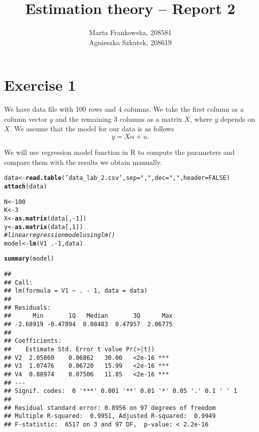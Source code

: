 \documentclass[12pt, a4paper]{article}\usepackage[]{graphicx}\usepackage[]{color}
\makeatletter
\newcommand{\hlnum}[1]{\textcolor[rgb]{0.686,0.059,0.569}{#1}}%
\newcommand{\hlstr}[1]{\textcolor[rgb]{0.192,0.494,0.8}{#1}}%
\newcommand{\hlcom}[1]{\textcolor[rgb]{0.678,0.584,0.686}{\textit{#1}}}%
\newcommand{\hlopt}[1]{\textcolor[rgb]{0,0,0}{#1}}%
\newcommand{\hlstd}[1]{\textcolor[rgb]{0.345,0.345,0.345}{#1}}%
\newcommand{\hlkwb}[1]{\textcolor[rgb]{0.69,0.353,0.396}{#1}}%
\newcommand{\hlkwc}[1]{\textcolor[rgb]{0.333,0.667,0.333}{#1}}%
\newcommand{\hlkwd}[1]{\textcolor[rgb]{0.737,0.353,0.396}{\textbf{#1}}}%
\newenvironment{kframe}{%
 \def\at@end@of@kframe{}%
 \ifinner\ifhmode%
  \def\at@end@of@kframe{\end{minipage}}%
  \begin{minipage}{\columnwidth}%
 \fi\fi%
 \def\FrameCommand##1{\hskip\@totalleftmargin \hskip-\fboxsep
 \colorbox{shadecolor}{##1}\hskip-\fboxsep
     \hskip-\linewidth \hskip-\@totalleftmargin \hskip\columnwidth}%
 \MakeFramed {\advance\hsize-\width
   \@totalleftmargin\z@ \linewidth\hsize
   \@setminipage}}%
 {\par\unskip\endMakeFramed%
 \at@end@of@kframe}
\newenvironment{knitrout}{}{} %
\makeatother
\begin{document}
\title{Estimation theory -- Report 2}
\author{Marta Frankowska, 208581 \\ Agnieszka Szkutek, 208619}
\maketitle
\tableofcontents 


\section{Exercise 1}


We have data file with 100 rows and 4 columns. We take the first column as a column vector $y$ and the remaining 3 columns as a matrix $X$, where $y$ depends on $X$.
We assume that the model for our data is as follows
\begin{equation} 
\label{eq1}
y = X \alpha + u. 
\end{equation}

We will use regression model function in R to compute the parameters and compare them with the results we obtain manually. 
\begin{knitrout}
\color{fgcolor}\begin{kframe}
\begin{alltt}
\hlstd{data} \hlkwb{<-} \hlkwd{read.table}\hlstd{(}\hlstr{'data_lab_2.csv'}\hlstd{,} \hlkwc{sep} \hlstd{=} \hlstr{","}\hlstd{,} \hlkwc{dec} \hlstd{=} \hlstr{","}\hlstd{,} \hlkwc{header} \hlstd{=} \hlnum{FALSE}\hlstd{)}
\hlkwd{attach}\hlstd{(data)}

\hlstd{N} \hlkwb{<-} \hlnum{100}
\hlstd{K} \hlkwb{<-} \hlnum{3}
\hlstd{X} \hlkwb{<-} \hlkwd{as.matrix}\hlstd{(data[,} \hlopt{-}\hlnum{1}\hlstd{])}
\hlstd{y} \hlkwb{<-} \hlkwd{as.matrix}\hlstd{(data[,} \hlnum{1}\hlstd{])}
\hlcom{# linear regression model using lm()}
\hlstd{model} \hlkwb{<-} \hlkwd{lm}\hlstd{(V1} \hlopt{~} \hlstd{.} \hlopt{-} \hlnum{1}\hlstd{, data)}

\hlkwd{summary}\hlstd{(model)}
\end{alltt}
\begin{verbatim}
## 
## Call:
## lm(formula = V1 ~ . - 1, data = data)
## 
## Residuals:
##      Min       1Q   Median       3Q      Max 
## -2.68919 -0.47894  0.08483  0.47957  2.06775 
## 
## Coefficients:
##    Estimate Std. Error t value Pr(>|t|)    
## V2  2.05860    0.06862   30.00   <2e-16 ***
## V3  1.07476    0.06720   15.99   <2e-16 ***
## V4  0.88974    0.07506   11.85   <2e-16 ***
## ---
## Signif. codes:  0 '***' 0.001 '**' 0.01 '*' 0.05 '.' 0.1 ' ' 1
## 
## Residual standard error: 0.8956 on 97 degrees of freedom
## Multiple R-squared:  0.9951,	Adjusted R-squared:  0.9949 
## F-statistic:  6517 on 3 and 97 DF,  p-value: < 2.2e-16
\end{verbatim}
\end{kframe}
\end{knitrout}
\end{document}
